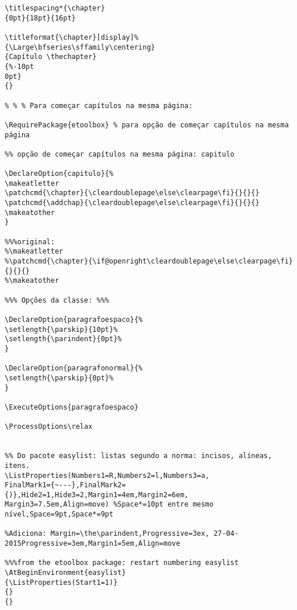 \documentclass{ltxdoc}
\begin{document}
\begin{lstlisting}
\titlespacing*{\chapter}
{0pt}{18pt}{16pt}

\titleformat{\chapter}[display]%
{\Large\bfseries\sffamily\centering}
{Capítulo \thechapter}
{%-10pt
0pt}
{}

% % % Para começar capítulos na mesma página:

\RequirePackage{etoolbox} % para opção de começar capítulos na mesma página

%% opção de começar capítulos na mesma página: capitulo

\DeclareOption{capitulo}{%
\makeatletter
\patchcmd{\chapter}{\cleardoublepage\else\clearpage\fi}{}{}{}
\patchcmd{\addchap}{\cleardoublepage\else\clearpage\fi}{}{}{}
\makeatother
}

%%%original:
%\makeatletter
%\patchcmd{\chapter}{\if@openright\cleardoublepage\else\clearpage\fi}{}{}{}
%\makeatother

%%% Opções da classe: %%%

\DeclareOption{paragrafoespaco}{%
\setlength{\parskip}{10pt}%
\setlength{\parindent}{0pt}%
}

\DeclareOption{paragrafonormal}{%
\setlength{\parskip}{0pt}%
}

\ExecuteOptions{paragrafoespaco}

\ProcessOptions\relax


%% Do pacote easylist: listas segundo a norma: incisos, alíneas, itens.
\ListProperties(Numbers1=R,Numbers2=l,Numbers3=a,
FinalMark1={~---},FinalMark2={)},Hide2=1,Hide3=2,Margin1=4em,Margin2=6em,
Margin3=7.5em,Align=move) %Space*=10pt entre mesmo nível,Space=9pt,Space*=9pt

%Adiciona: Margin=\the\parindent,Progressive=3ex, 27-04-2015Progressive=3em,Margin1=5em,Align=move

%%%from the etoolbox package: restart numbering easylist
\AtBeginEnvironment{easylist}
{\ListProperties(Start1=1)}
{}
{}


\end{lstlisting}
\end{document}
